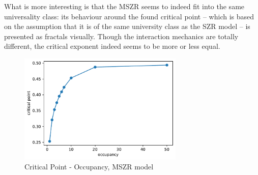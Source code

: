 \documentclass[11pt]{article}
\begin{document}
What is more interesting is that the MSZR seems to indeed fit into the same universality class: its behaviour around the found critical point -- which is based on the assumption that it is of the same university class as the SZR model -- is presented as fractals visually. Though the interaction mechanics are totally different, the critical exponent indeed seems to be more or less equal.

\begin{figure}[H]
    \centering
    \includegraphics[width=0.7\textwidth]{fig/Critical_Occupancy_MSZR.pdf}
    \caption{Critical Point - Occupancy, MSZR model}
    \label{fig:alphac-m}
\end{figure}

\label{hex}
\end{document}

